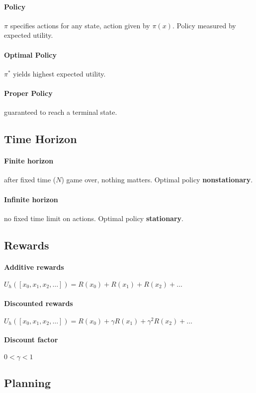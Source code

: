 \begin{multicols}{4}
\paragraph{Policy} $\pi$ specifies actions for any state, action given by $\pi(x)$. Policy measured by expected utility.

\paragraph{Optimal Policy} $\pi^*$ yields highest expected utility.

\paragraph{Proper Policy} guaranteed to reach a terminal state.

\subsection{Time Horizon}
\paragraph{Finite horizon} after fixed time ($N$) game over, nothing matters. Optimal policy \textbf{nonstationary}.
\paragraph{Infinite horizon} no fixed time limit on actions. Optimal policy \textbf{stationary}.

\subsection{Rewards}
\paragraph{Additive rewards} $U_h([x_0,x_1,x_2,\dots]) = R(x_0) + R(x_1) + R(x_2) + \dots$
\paragraph{Discounted rewards} $U_h([x_0,x_1,x_2, \dots]) = R(x_0) + \gamma R(x_1) + \gamma^2 R(x_2) + \dots$
\paragraph{Discount factor} $0 < \gamma < 1$

\subsection{Planning}

\end{multicols}
